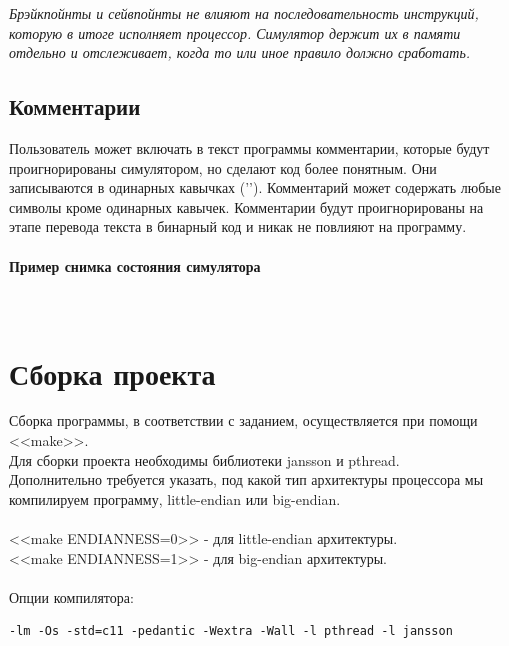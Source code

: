 { \it \large
Брэйкпойнты и сейвпойнты не влияют на последовательность инструкций, которую в итоге исполняет процессор. Симулятор держит их в памяти отдельно и отслеживает, когда то или иное правило должно сработать.
}
\\

\subsection{Комментарии}
Пользователь может включать в текст программы комментарии, которые будут проигнорированы симулятором, но сделают код более понятным. Они записываются в одинарных кавычках ('\space'). Комментарий может содержать любые символы кроме одинарных кавычек.
Комментарии будут проигнорированы на этапе перевода текста в бинарный код и никак не повлияют на программу.

\newpage
\paragraph{Пример снимка состояния симулятора}~\\


\newpage
\section{Сборка проекта}
Сборка программы, в соответствии с заданием, осуществляется при помощи <<make>>. \\
Для сборки проекта необходимы библиотеки jansson и pthread. \\
Дополнительно требуется указать, под какой тип архитектуры процессора мы компилируем программу, little-endian или big-endian. \\\\
<<make ENDIANNESS=0>> - для little-endian архитектуры. \\
<<make ENDIANNESS=1>> - для big-endian архитектуры. \\
~\\
Опции компилятора:
\begin{lstlisting}
-lm -Os -std=c11 -pedantic -Wextra -Wall -l pthread -l jansson
\end{lstlisting}


